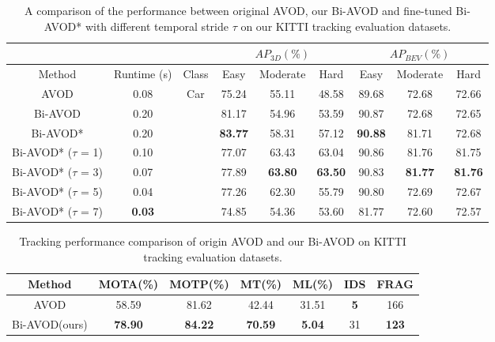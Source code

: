 \documentclass[letterpaper, 10 pt, conference]{ieeeconf}  %
\begin{document}
\begin{table}\centering
	\begin{tabular}{ccccccccc}
		&   		   &  											& \multicolumn{3}{c}{$AP_{3D}(\%)$}  		    & \multicolumn{3}{c}{$AP_{BEV}(\%)$} \\ \toprule[1.5pt]
		Method   & Runtime (s) & \multicolumn{1}{c|}{Class}  				& Easy & Moderate & \multicolumn{1}{c|}{Hard}  & Easy   & Moderate     & Hard    \\ \midrule
		AVOD\cite{ku2018joint}     & 0.08        & \multicolumn{1}{c|}{\multirow{7}{*}{Car}}  & 75.24 & 55.11   & \multicolumn{1}{c|}{48.58} & 89.68  & 72.68        & 72.66   \\
		Bi-AVOD  & 0.20        & \multicolumn{1}{c|}{}                      & 81.17 & 54.96   & \multicolumn{1}{c|}{53.59} & 90.87  & 72.68        & 72.65   \\
		Bi-AVOD* & 0.20        & \multicolumn{1}{c|}{}    & \textbf{83.77}  & 58.31  & \multicolumn{1}{c|}{57.12} & \textbf{90.88} & 81.71 & 72.68  \\
		Bi-AVOD* ($\tau$ = 1)  & 0.10  & \multicolumn{1}{c|}{}      & 77.07 & 63.43     & \multicolumn{1}{c|}{63.04} & 90.86    & 81.76        & 81.75     \\
		Bi-AVOD* ($\tau$ = 3)  & 0.07  & \multicolumn{1}{c|}{}      & 77.89 & \textbf{63.80} & \multicolumn{1}{c|}{\textbf{63.50}} & 90.83    & \textbf{81.77}    & \textbf{81.76}  \\
		Bi-AVOD* ($\tau$ = 5)  & 0.04  & \multicolumn{1}{c|}{}      & 77.26 & 62.30     & \multicolumn{1}{c|}{55.79} & 90.80    & 72.69        & 72.67     \\
		Bi-AVOD* ($\tau$ = 7)  & \textbf{0.03} & \multicolumn{1}{c|}{}      & 74.85 & 54.36   & \multicolumn{1}{c|}{53.60} & 81.77    & 72.60        & 72.57 \\
		\bottomrule[1.5pt]
	\end{tabular}
	\caption{A comparison of the performance between original AVOD, our Bi-AVOD and fine-tuned Bi-AVOD* 
		with different temporal stride $\tau$ on our KITTI tracking evaluation datasets.}
	\label{table:result_detection}
\end{table}


\begin{table}\centering
	\begin{tabular}{ccccccc}
		\toprule[1.5pt]
		Method        & MOTA(\%) & MOTP(\%) & MT(\%) & ML(\%) & IDS & FRAG \\ \midrule
		AVOD\cite{ku2018joint}          & 58.59    & 81.62    & 42.44  & 31.51  & \textbf{5}   & 166  \\
		Bi-AVOD(ours) & \textbf{78.90}    & \textbf{84.22}    & \textbf{70.59}  & \textbf{5.04}  & 31  &  \textbf{123}  \\ 
		\bottomrule[1.5pt]
	\end{tabular}
	\caption{Tracking performance comparison of origin AVOD and our Bi-AVOD on KITTI tracking evaluation datasets.}
	\label{label:result_tracking}
\end{table}
\end{document}
